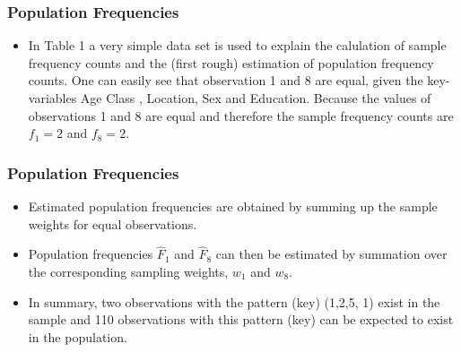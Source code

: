 \documentclass{beamer}
\begin{document}
	\begin{frame}	
		\frametitle{Population Frequencies}
		
\begin{itemize}
	\item In Table 1 a very simple data set is used to explain the calulation of sample
	frequency counts and the (first rough) estimation of population frequency counts.
	One can easily see that observation 1 and 8 are equal, given the key-variables Age
	Class , Location, Sex and Education. Because the values of observations 1 and
	8 are equal and therefore the sample frequency counts are $f_1=2$ and $f_8=2$.
\end{itemize}
\end{frame}
\begin{frame}	
	\frametitle{Population Frequencies}
	
	\begin{itemize}
	\item Estimated population frequencies are obtained by summing up the sample weights
	for equal observations. 
	\item Population frequencies $\hat{F}_1$ and $\hat{F}_8$ can then be estimated
	by summation over the corresponding sampling weights, $w_1$ and $w_8$. 
	\item In summary,
	two observations with the pattern (key) (1,2,5, 1) exist in the sample and 110
	observations with this pattern (key) can be expected to exist in the population.
\end{itemize}
\end{frame}
\end{document}
